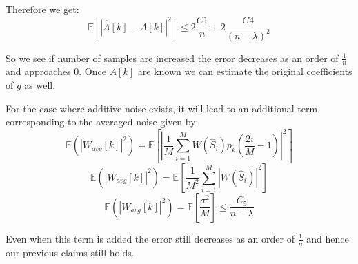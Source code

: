 \documentclass{article}
\begin{document}
Therefore we get:
$$\mathbb{E}[|\hat{A}[k] - A[k]|^2] \le 2 \frac{C1}{n} + 2 \frac{C4}{(n-\lambda)^2}$$

So we see if number of samples are increased the error decreases as an order of $\frac{1}{n}$ and approaches 0. Once $A[k]$ are known we can estimate the original coefficients of $g$ as well.

For the case where additive noise exists, it will lead to an additional term corresponding to the averaged noise given by:
$$\mathbb{E}(|W_{avg}[k]|^2) = \mathbb{E}[|\frac{1}{M}\sum_{i=1}^M W(\hat{S}_i)p_k(\frac{2i}{M}-1)|^2]$$
$$\mathbb{E}(|W_{avg}[k]|^2) = \mathbb{E}[\frac{1}{M^2}\sum_{i=1}^M |W(\hat{S}_i)|^2]$$
$$\mathbb{E}(|W_{avg}[k]|^2) = \mathbb{E}[\frac{\sigma^2}{M}] \le \frac{C_5}{n-\lambda}$$

Even when this term is added the error still decreases as an order of $\frac{1}{n}$ and hence our previous claims still holds.
\end{document}

